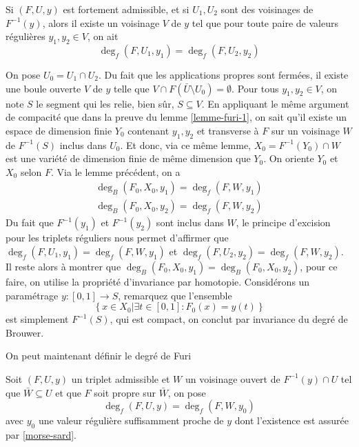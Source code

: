 \documentclass[memoire.tex]{subfiles}
\begin{document}
\begin{lemme}
    Si $(F,U,y)$ est fortement 
    admissible, et si $U_1,U_2$ 
    sont des voisinages de $F^{-1}(y)
    $, alors il existe un 
    voisinage $V$ de $y$ tel que 
    pour toute paire de valeurs 
    régulières $y_1,y_2\in V$, on ait 
    \begin{equation*}
        \deg_f(F,U_1,y_1)= \deg_f(F,U_2,y_2)
    \end{equation*}
\end{lemme}
\begin{preuve}
    On pose $U_0=U_1\cap U_2$. Du fait que les applications propres sont fermées, il existe une boule ouverte  $V$ de $y$ telle que $V\cap F(\bar{U}\setminus U_0)=\emptyset$. Pour tous $y_1,y_2\in V$, on note $S$ le segment qui les relie, bien sûr, $S\subseteq V$. En appliquant le même argument de compacité que dans la preuve du lemme \ref{lemme-furi-1}, on sait qu'il existe un espace de dimension finie $Y_0$ contenant $y_1,y_2$ et transverse à $F$ sur un voisinage $W$ de $F^{-1}(S)$ inclus dans $U_0$. Et donc, via ce même lemme, $X_0=F^{-1}(Y_0)\cap W$ est une variété de dimension finie de même dimension que $Y_0$. On oriente $Y_0$ et $X_0$ selon $F$. Via le lemme précédent, on a
    \begin{align*}
        \deg_B(F_0,X_0,y_1)=\deg_f(F,W,y_1)\\
        \deg_B(F_0,X_0,y_2)=\deg_f(F,W,y_2)
    \end{align*}
    Du fait que $F^{-1}(y_1)$ et $F^{-1}(y_2)$ sont inclus dans $W$, le principe d'excision pour les triplets réguliers nous permet d'affirmer que 
    $\deg_f(F,U_1,y_1)=\deg_f(F,W,y_1)$ et $\deg_f(F,U_2,y_2)=\deg_f(F,W,y_2)$. Il reste alors à montrer que $\deg_B(F_0,X_0,y_1)=\deg_B(F_0,X_0,y_2)$, pour ce faire, on utilise la propriété d'invariance par homotopie. Considérons un paramétrage 
    $y: [0,1]\rightarrow S$, remarquez que l'ensemble
    \begin{equation*}
        \left\{x\in X_0\big|\exists t\in [0,1]:  F_0(x)=y(t)\right\}
    \end{equation*}
    est simplement $F^{-1}(S)$, qui est compact, on conclut par invariance du degré  de Brouwer.
\end{preuve}
On peut maintenant définir le degré de Furi
\begin{definition}
    Soit $(F,U,y)$ un triplet admissible et $W$ un voisinage ouvert de $F^{-1}(y)\cap U$ tel que $\bar{W}\subseteq U$ et que $F$ soit propre sur $\bar{W}$, on pose
    \begin{equation*}
        \deg_f(F,U,y)=\deg_f(F,W,y_0)
    \end{equation*}
    avec $y_0$ une valeur régulière suffisamment proche de $y$ dont l'existence est assurée par \ref{morse-sard}.
\end{definition}
\end{document}
